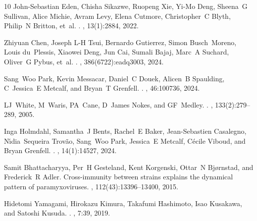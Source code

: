 \documentclass[12pt]{article}
\begin{document}
\begin{thebibliography}{10}
John-Sebastian Eden, Chisha Sikazwe, Ruopeng Xie, Yi-Mo Deng, Sheena~G Sullivan, Alice Michie, Avram Levy, Elena Cutmore, Christopher~C Blyth, Philip~N Britton, et~al.
.
, 13(1):2884, 2022.

Zhiyuan Chen, Joseph L-H Tsui, Bernardo Gutierrez, Simon Busch~Moreno, Louis du~Plessis, Xiaowei Deng, Jun Cai, Sumali Bajaj, Marc~A Suchard, Oliver~G Pybus, et~al.
.
, 386(6722):eadq3003, 2024.

Sang~Woo Park, Kevin Messacar, Daniel~C Douek, Alicen~B Spaulding, C~Jessica~E Metcalf, and Bryan~T Grenfell.
.
, 46:100736, 2024.

LJ~White, M~Waris, PA~Cane, D~James Nokes, and GF~Medley.
.
, 133(2):279--289, 2005.

Inga Holmdahl, Samantha~J Bents, Rachel~E Baker, Jean-Sebastien Casalegno, N{\'\i}dia~Sequeira Trov{\~a}o, Sang~Woo Park, Jessica~E Metcalf, C{\'e}cile Viboud, and Bryan Grenfell.
.
, 14(1):14527, 2024.

Samit Bhattacharyya, Per~H Gesteland, Kent Korgenski, Ottar~N Bj{\o}rnstad, and Frederick~R Adler.
\newblock Cross-immunity between strains explains the dynamical pattern of paramyxoviruses.
, 112(43):13396--13400, 2015.

Hidetomi Yamagami, Hirokazu Kimura, Takafumi Hashimoto, Isao Kusakawa, and Satoshi Kusuda.
.
, 7:39, 2019.


\end{thebibliography}
\end{document}
